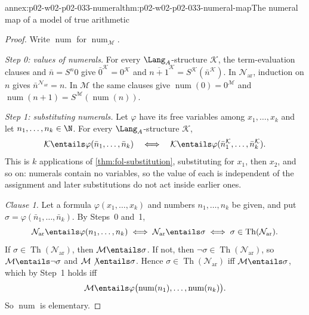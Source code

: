 \begin{annexitem}{annex:p02-w02-p02-033-numeral}{thm:p02-w02-p02-033-numeral-map}{The numeral map of a model of true arithmetic}
\begin{proof}
Write \(\operatorname{num}\) for \(\operatorname{num}_{\mathcal M}\).

\emph{Step 0: values of numerals.}  For every \(\Lang_A\)-structure
\(\mathcal K\), the term-evaluation clauses and \(\bar n=S^n0\) give
\(\bar 0^{\mathcal K}=0^{\mathcal K}\) and
\(\overline{n+1}^{\mathcal K}=S^{\mathcal K}(\bar n^{\mathcal K})\).  In
\(\mathcal N_{\mathrm{ar}}\), induction on \(n\) gives
\(\bar n^{\mathcal N_{\mathrm{ar}}}=n\).  In \(\mathcal M\) the same clauses
give \(\operatorname{num}(0)=0^{\mathcal M}\) and
\(\operatorname{num}(n+1)=S^{\mathcal M}(\operatorname{num}(n))\).

\emph{Step 1: substituting numerals.}  Let \(\varphi\) have its free
variables among \(x_1,\ldots,x_k\) and let \(n_1,\ldots,n_k\in\N\).  For
every \(\Lang_A\)-structure \(\mathcal K\),
\[
 \mathcal K\entails\varphi(\bar n_1,\ldots,\bar n_k)
 \quad\Longleftrightarrow\quad
 \mathcal K\entails\varphi(\bar n_1^{\mathcal K},\ldots,\bar n_k^{\mathcal K}).
\]
This is \(k\) applications of \cref{thm:fol-substitution}, substituting for
\(x_1\), then \(x_2\), and so on: numerals contain no variables, so the
value of each is independent of the assignment and later substitutions do
not act inside earlier ones.

\emph{Clause 1.}  Let a formula \(\varphi(x_1,\ldots,x_k)\) and numbers
\(n_1,\ldots,n_k\) be given, and put
\(\sigma=\varphi(\bar n_1,\ldots,\bar n_k)\).  By Steps~0 and~1,
\[
 \mathcal N_{\mathrm{ar}}\entails\varphi(n_1,\ldots,n_k)
 \iff\mathcal N_{\mathrm{ar}}\entails\sigma
 \iff\sigma\in\operatorname{Th}(\mathcal N_{\mathrm{ar}}).
\]
If
\(\sigma\in\operatorname{Th}(\mathcal N_{\mathrm{ar}})\), then
\(\mathcal M\entails\sigma\).  If not, then
\(\neg\sigma\in\operatorname{Th}(\mathcal N_{\mathrm{ar}})\), so
\(\mathcal M\entails\neg\sigma\) and \(\mathcal M\not\entails\sigma\).
Hence \(\sigma\in\operatorname{Th}(\mathcal N_{\mathrm{ar}})\) iff
\(\mathcal M\entails\sigma\), which by Step~1 holds iff
\[
 \mathcal M\entails\varphi\bigl(\operatorname{num}(n_1),\ldots,
 \operatorname{num}(n_k)\bigr).
\]
So \(\operatorname{num}\) is elementary.


\end{proof}
\end{annexitem}
